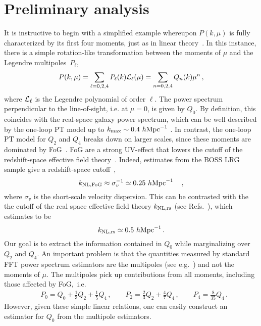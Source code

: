\documentclass[12pt,a4paper]{article}
\newcommand{\be}{\begin{equation}}
\newcommand{\ee}{\end{equation}}
\newcommand\hMpc{h\text{Mpc}^{-1}}
\begin{document}
\section{Preliminary analysis}
\label{sec:prel}


It is instructive to begin with 
a simplified example whereupon $P(k,\mu)$ is fully characterized by its
first four moments, just as in linear theory~\cite{Kaiser:1987qv}. 
In this instance, there is a simple rotation-like transformation 
between the moments of $\mu$
and the Legendre multipoles~$P_{\ell}$,
\be
P(k,\mu)=\sum_{\ell=0,2,4}P_\ell(k) {\cal L}_\ell(\mu)=\sum_{n=0,2,4}Q_n(k) \mu^{n}\,,
\ee
where ${\cal L}_\ell$ is the Legendre polynomial of order $\ell$.
The power spectrum perpendicular to the line-of-sight, i.e. at $\mu =0$, is given by $Q_0$. 
By definition, this coincides with the real-space galaxy power spectrum, 
which can be well described by the one-loop PT model up to $k_{\rm max}\sim 0.4~\hMpc$ \cite{Schmittfull:2018yuk}. 
In contrast, the one-loop PT model for 
$Q_2$ and $Q_4$ breaks down on larger scales, since these moments are dominated by FoG~\cite{Ivanov:2019pdj,Nishimichi:2020tvu,Chudaykin:2020aoj}. 
FoG are a strong UV-effect that lowers the cutoff of the redshift-space effective field theory~\cite{Senatore:2014vja,Lewandowski:2015ziq,Perko:2016puo}. 
Indeed, estimates from the BOSS LRG sample 
give a redshift-space cutoff~\cite{Beutler:2016arn},
\be 
k_{\rm NL, FoG}\approx \sigma_v^{-1}\simeq 0.25~\hMpc\quad\,,
\ee
where $\sigma_v$ is the short-scale velocity dispersion. This can be contrasted with the 
the cutoff of the real space effective field theory $k_{\rm NL, rs}$ (see Refs.~\cite{Baumann:2010tm,Carrasco:2012cv,Chudaykin:2020hbf}), 
which~\cite{Baldauf:2016sjb} estimates to be
\be
k_{\rm NL, rs}\simeq 0.5~\hMpc\,.
\ee
Our goal is to extract
the information contained in $Q_0$ while marginalizing over $Q_2$ and $Q_4$.
An important problem is that the quantities measured by
standard FFT power spectrum estimators 
are the multipoles (see e.g.~\cite{Yamamoto:2005dz,Scoccimarro:2015bla,Hand:2017irw})
and not the moments of $\mu$.
The multipoles pick up contributions from all moments, including those affected by FoG,~i.e.
\be
\label{eq:multq}
\begin{split}
& P_0 = Q_0 +\frac{1}{3}Q_2+\frac{1}{5}Q_4\,,\quad \quad P_2 = \frac{2}{3}Q_2+\frac{4}{7}Q_4\,,\quad \quad P_4 = \frac{8}{35}Q_4\,.
\end{split}
\ee
However, given these simple linear relations, one can easily construct 
an estimator for $Q_0$ from the multipole estimators.
\end{document}
